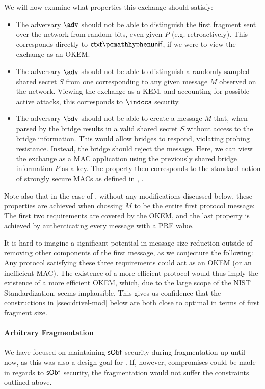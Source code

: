 We will now examine what properties this exchange should satisfy:
\begin{itemize}
    \item The adversary $\adv$ should not be able to distinguish the first fragment sent over the network from random bits, even given $P$ (e.g. retroactively). This corresponds directly to $\ctxtunif$, if we were to view the exchange as an OKEM.

    \item The adversary $\adv$ should not be able to distinguish a randomly sampled shared secret $S$ from one corresponding to any given message $M$ observed on the network. Viewing the exchange as a KEM, and accounting for possible active attacks, this corresponds to $\indcca$ security.
    
    \item The adversary $\bdv$ should not be able to create a message $M$ that, when parsed by the bridge results in a valid shared secret $S$ without access to the bridge information. This would allow bridges to respond, violating probing resistance. Instead, the bridge should reject the message. Here, we can view the exchange as a MAC application using the previously shared bridge information $P$ as a key. The property then corresponds to the standard notion of strongly secure MACs as defined in \cite[Definition~4.3]{katz_lindell}, \cite[Chapter~2]{AC:BelNam00}.
\end{itemize}

Note also that in the case of \drivel{}, without any modifications discussed below, these properties are achieved when chossing $M$ to be the entire first protocol message: The first two requirements are covered by the OKEM, and the last property is achieved by authenticating every message with a PRF value.

It is hard to imagine a significant potential in message size reduction outside of removing other components of the first \drivel{} message, as we conjecture the following:
Any protocol satisfying these three requirements could act as an OKEM (or an inefficient MAC). The existence of a more efficient protocol would thus imply the existence of a more efficient OKEM, which, due to the large scope of the NIST Standardization, seems implausible.
This gives us confidence that the constructions in \cref{ssec:drivel-mod} below are both close to optimal in terms of first fragment size.

\paragraph{Arbitrary Fragmentation}
We have focused on maintaining $\mathsf{sObf}$ security during fragmentation up until now, as this was also a design goal for \drivel{}.
If, however, compromises could be made in regards to $\mathsf{sObf}$ security, the fragmentation would not suffer the constraints outlined above.

